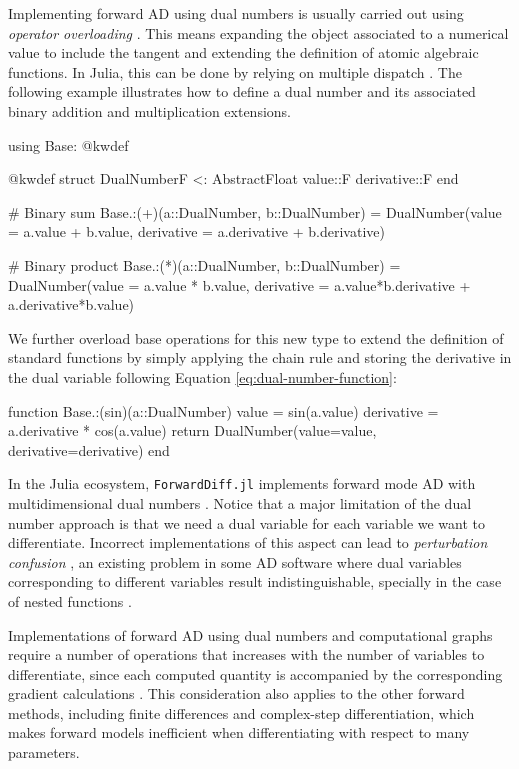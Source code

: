Implementing forward AD using dual numbers is usually carried out using \textit{operator overloading} \cite{Neuenhofen_2018}. 
This means expanding the object associated to a numerical value to include the tangent and extending the definition of atomic algebraic functions. 
In Julia, this can be done by relying on multiple dispatch \cite{Julialang_2017}. 
The following example illustrates how to define a dual number and its associated binary addition and multiplication extensions. 
\begin{jllisting}
using Base: @kwdef

@kwdef struct DualNumber{F <: AbstractFloat}
    value::F
    derivative::F
end

# Binary sum
Base.:(+)(a::DualNumber, b::DualNumber) = DualNumber(value = a.value + b.value, derivative = a.derivative + b.derivative)

# Binary product 
Base.:(*)(a::DualNumber, b::DualNumber) = DualNumber(value = a.value * b.value, derivative = a.value*b.derivative + a.derivative*b.value)
\end{jllisting}
We further overload base operations for this new type to extend the definition of standard functions by simply applying the chain rule and storing the derivative in the dual variable following Equation \eqref{eq:dual-number-function}:
\begin{jllisting}
function Base.:(sin)(a::DualNumber)
    value = sin(a.value)
    derivative = a.derivative * cos(a.value)
    return DualNumber(value=value, derivative=derivative)
end
\end{jllisting}
In the Julia ecosystem, \texttt{ForwardDiff.jl} implements forward mode AD with multidimensional dual numbers \cite{RevelsLubinPapamarkou2016}. 
Notice that a major limitation of the dual number approach is that we need a dual variable for each variable we want to differentiate. 
Incorrect implementations of this aspect can lead to \textit{perturbation confusion} \cite{siskind2005perturbation, manzyuk2019perturbation}, an existing problem in some AD software where dual variables corresponding to different variables result indistinguishable, specially in the case of nested functions \cite{manzyuk2019perturbation}.   

Implementations of forward AD using dual numbers and computational graphs require a number of operations that increases with the number of variables to differentiate, since each computed quantity is accompanied by the corresponding gradient calculations \cite{Griewack-on-AD}. 
This consideration also applies to the other forward methods, including finite differences and complex-step differentiation, which makes forward models inefficient when differentiating with respect to many parameters. 

